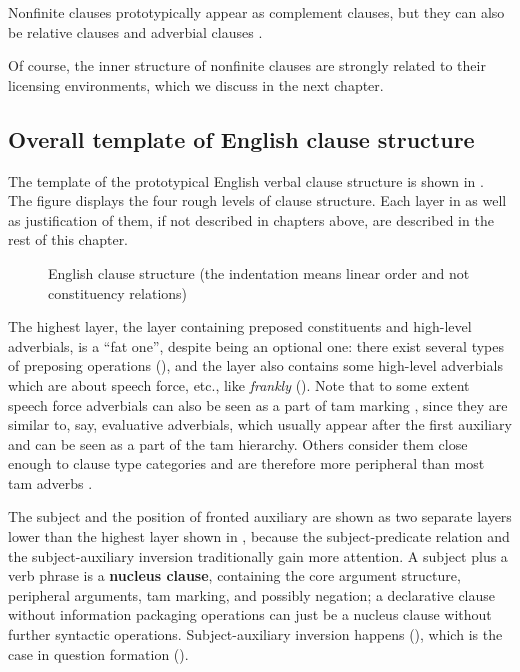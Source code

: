 \documentclass[UTF8, a4paper, oneside, scheme=plain, 12pt]{ctexbook}
\newcommand*{\citesec}[1]{\S~{#1}}
\newcommand*{\citepage}[1]{p.~{#1}}
\newcommand*{\citepages}[1]{pp.~{#1}}
\newcommand*{\concept}[1]{\textbf{#1}}
\newcommand{\form}[1]{\emph{#1}}
\begin{document}
Nonfinite clauses prototypically appear as complement clauses, 
but they can also be relative clauses and adverbial clauses \citep[\citepage{1264}]{cgel}.



Of course, the inner structure of nonfinite clauses are strongly related to their licensing environments,
which we discuss in the next chapter.

\subsection{Overall template of English clause structure}\label{sec:clause-template}

The template of the prototypical English verbal clause structure 
is shown in .
The figure displays the four rough levels of clause structure.
Each layer in  as well as justification of them,
if not described in chapters above, are described 
in the rest of this chapter.

\begin{figure}[H]
    \centering
    {\small }
    \caption{English clause structure (the indentation means linear order and not constituency relations)}
    \label{fig:clause-template}
\end{figure}

The highest layer, the layer containing preposed constituents and high-level adverbials, 
is a ``fat one'', despite being an optional one: there exist several types of preposing operations (),
and the layer also contains some high-level adverbials
which are about speech force, etc., %
like \form{frankly} ().
Note that to some extent speech force adverbials 
can also be seen as a part of \acs{tam} marking
\citep[\citesec{4.4}]{cinque1999adverbs},
since they are similar to, say, evaluative adverbials, 
which usually appear after the first auxiliary 
and can be seen as a part of the \acs{tam} hierarchy.
Others consider them close enough to clause type categories 
and are therefore more peripheral than most \acs{tam} adverbs 
\citep[\citepages{214-216}]{van2013clause}.

The subject and the position of fronted auxiliary
are shown as two separate layers lower than the highest layer shown in ,
because the subject-predicate relation 
and the subject-auxiliary inversion 
traditionally gain more attention.
A subject plus a verb phrase is a \concept{nucleus clause}, containing the core argument structure, peripheral arguments, \acs{tam} marking, and possibly negation;
a declarative clause without information packaging operations
can just be a nucleus clause without further syntactic operations.
Subject-auxiliary inversion happens (),
which is the case in %
question formation ().
\end{document}
